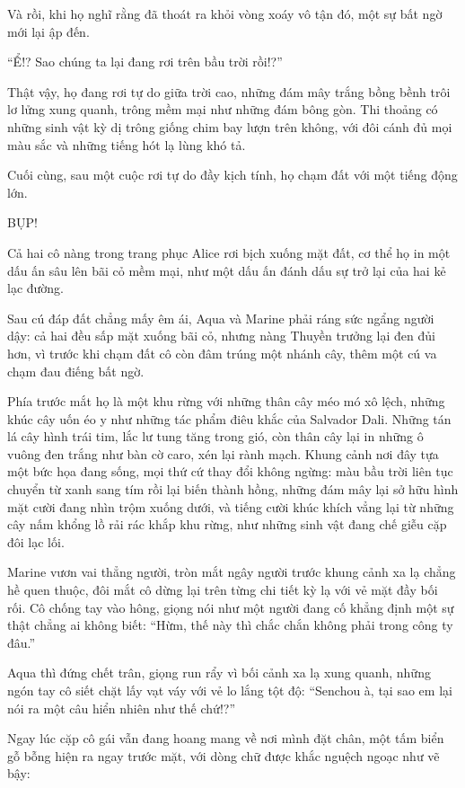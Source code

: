 \documentclass[../main.tex]{subfiles}
\begin{document}
Và rồi, khi họ nghĩ rằng đã thoát ra khỏi vòng xoáy vô tận đó, một sự bất ngờ mới lại ập đến.

``Ể!? Sao chúng ta lại đang rơi trên bầu trời rồi!?''

Thật vậy, họ đang rơi tự do giữa trời cao, những đám mây trắng bồng bềnh trôi lơ lửng xung quanh, trông mềm mại như những đám bông gòn. Thi thoảng có những sinh vật kỳ dị trông giống chim bay lượn trên không, với đôi cánh đủ mọi màu sắc và những tiếng hót lạ lùng khó tả.

Cuối cùng, sau một cuộc rơi tự do đầy kịch tính, họ chạm đất với một tiếng động lớn.

BỤP!

Cả hai cô nàng trong trang phục Alice rơi bịch xuống mặt đất, cơ thể họ in một dấu ấn sâu lên bãi cỏ mềm mại, như một dấu ấn đánh dấu sự trở lại của hai kẻ lạc đường.

\ct

Sau cú đáp đất chẳng mấy êm ái, Aqua và Marine phải ráng sức ngẩng người dậy: cả hai đều sấp mặt xuống bãi cỏ, nhưng nàng Thuyền trưởng lại đen đủi hơn, vì trước khi chạm đất cô còn đâm trúng một nhánh cây, thêm một cú va chạm đau điếng bất ngờ.

Phía trước mắt họ là một khu rừng với những thân cây méo mó xô lệch, những khúc cây uốn éo y như những tác phẩm điêu khắc của Salvador Dali. Những tán lá cây hình trái tim, lắc lư tung tăng trong gió, còn thân cây lại in những ô vuông đen trắng như bàn cờ caro, xén lại rành mạch. Khung cảnh nơi đây tựa một bức họa đang sống, mọi thứ cứ thay đổi không ngừng: màu bầu trời liên tục chuyển từ xanh sang tím rồi lại biến thành hồng, những đám mây lại sở hữu hình mặt cười đang nhìn trộm xuống dưới, và tiếng cười khúc khích vẳng lại từ những cây nấm khổng lồ rải rác khắp khu rừng, như những sinh vật đang chế giễu cặp đôi lạc lối.

Marine vươn vai thẳng người, tròn mắt ngây người trước khung cảnh xa lạ chẳng hề quen thuộc, đôi mắt cô dừng lại trên từng chi tiết kỳ lạ với vẻ mặt đầy bối rối. Cô chống tay vào hông, giọng nói như một người đang cố khẳng định một sự thật chẳng ai không biết: ``Hừm, thế này thì chắc chắn không phải trong công ty đâu.''

Aqua thì đứng chết trân, giọng run rẩy vì bối cảnh xa lạ xung quanh, những ngón tay cô siết chặt lấy vạt váy với vẻ lo lắng tột độ: ``Senchou à, tại sao em lại nói ra một câu hiển nhiên như thế chứ!?''

Ngay lúc cặp cô gái vẫn đang hoang mang về nơi mình đặt chân, một tấm biển gỗ bỗng hiện ra ngay trước mặt, với dòng chữ được khắc nguệch ngoạc như vẽ bậy:
\end{document}
